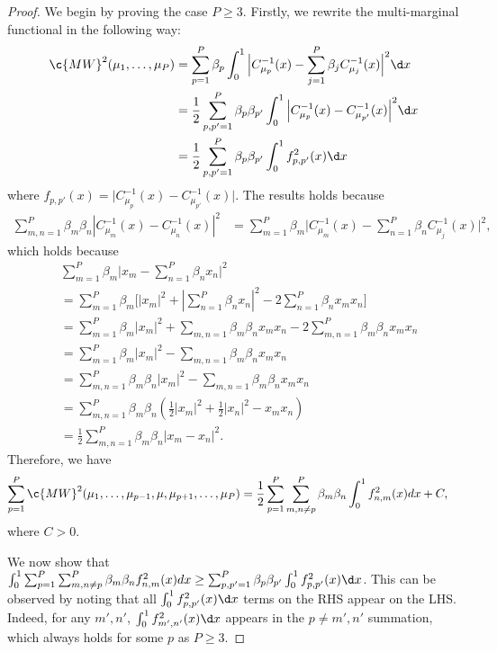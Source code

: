 \documentclass{article}
\begin{document}
\begin{proof}
We begin by proving the case $P\geq 3$.
Firstly, we rewrite the multi-marginal functional in the following way:
\begin{align}
    \c{MW}^2(\mu_1,\ldots,\mu_P)& = \sum_{p=1}^{P}\beta_p\int_{0}^1\Big|C_{\mu_p}^{-1}(x)-\sum_{j=1}^P\beta_jC_{\mu_j}^{-1}(x)\Big|^2\d x
    \\
    & = \frac{1}{2}\sum_{p,p'=1}^{P}\beta_p\beta_{p'}\int_{0}^1\Big|C_{\mu_p}^{-1}(x)-C_{\mu_{p'}}^{-1}(x)\Big|^2\d x
    \\
    & = \frac{1}{2}\sum_{p,p'=1}^{P}\beta_p\beta_{p'}\int_{0}^1f_{p,p'}^2(x)\d x
\end{align}
where $f_{p,p'}(x) = \Big|C_{\mu_p}^{-1}(x)-C_{\mu_{p'}}^{-1}(x)\Big|$. The results holds because
\begin{align} \sum_{m,n=1}^P \beta_m \beta_n |C_{\mu_m}^{-1}(x)-C_{\mu_n}^{-1}(x)|^2&= \sum_{m=1}^P \beta_m \Big|C_{\mu_m}^{-1}(x)-\sum_{n=1}^P \beta_n C_{\mu_j}^{-1}(x)\Big|^2,
\end{align}
which holds because 
\begin{align}
    &\sum_{m=1}^P \beta_m \Big|x_m-\sum_{n=1}^P \beta_n x_n\Big|^2
    \\
    &= \sum_{m=1}^P \beta_m \Big[|x_m|^2 + |\sum_{n=1}^P \beta_n x_n|^2 -2\sum_{n=1}^P \beta_n x_m x_n\Big]
    \\
    &= \sum_{m=1}^P \beta_m |x_m|^2 + \sum_{m,n=1}\beta_m\beta_n x_m x_n -2\sum_{m,n=1}^P \beta_m\beta_n x_m x_n
    \\
    &= \sum_{m=1}^P \beta_m |x_m|^2 - \sum_{m,n=1}\beta_m\beta_n x_m x_n
    \\
    &= \sum_{m,n=1}^P \beta_m \beta_n |x_m|^2 - \sum_{m,n=1}\beta_m\beta_n x_m x_n
    \\
    &= \sum_{m,n=1}^P \beta_m \beta_n  ( \frac{1}{2}|x_m|^2 + \frac{1}{2}|x_n|^2 -  x_m x_n )
    \\
    &= \frac{1}{2}\sum_{m,n=1}^P \beta_m \beta_n  |x_m -x_n|^2 .
\end{align}
Therefore, we have
\begin{align}
    \sum_{p=1}^P \c{MW}^2(\mu_1,\ldots,\mu_{p-1},\mu, \mu_{p+1},\ldots,\mu_P) &= \frac{1}{2}\sum_{p=1}^P \sum_{m,n\neq p}^{P} \beta_m\beta_{n}\int_{0}^1f_{n,m}^2(x)dx + C,
\end{align}
where $C>0$.

We now show that $\int_{0}^1\sum_{p=1}^P \sum_{m,n\neq p}^{P} \beta_m\beta_{n}f_{n,m}^2(x)dx \geq \sum_{p,p'=1}^{P}\beta_p\beta_{p'}\int_{0}^1f_{p,p'}^2(x)\d x$. 
This can be  observed by noting that all $\int_0^1f_{p,p'}^2(x)\d x$ terms on the RHS appear on the LHS. Indeed, for any $m',n'$, $\int_0^1f_{m',n'}^2(x)\d x$ appears in the $p \neq m',n'$ summation, which always holds for some $p$ as $P\geq 3$. 



\end{proof}
\end{document}
